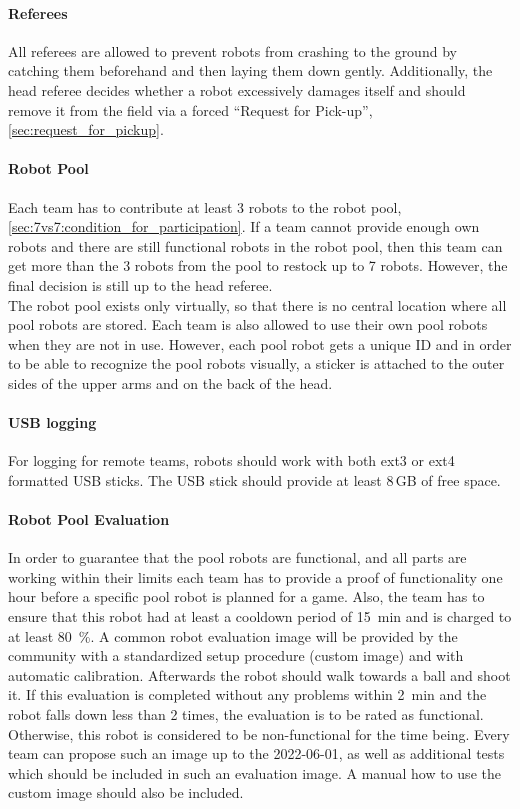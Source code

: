        \paragraph{Referees}
            \label{sec:7vs7:referee}
            All referees are allowed to prevent robots from crashing to the ground by catching them beforehand and then laying them down gently. Additionally, the head referee decides whether a robot excessively damages itself and should remove it from the field via a forced ``Request for Pick-up'', \cf \cref{sec:request_for_pickup}.

        \paragraph{Robot Pool}
            Each team has to contribute at least 3 robots to the robot pool, \cf \cref{sec:7vs7:condition_for_participation}. If a team cannot provide enough own robots and there are still functional robots in the robot pool, then this team can get more than the 3 robots from the pool to restock up to 7 robots. However, the final decision is still up to the head referee. \\
            The robot pool exists only virtually, so that there is no central location where all pool robots are stored. Each team is also allowed to use their own pool robots when they are not in use. However, each pool robot gets a unique ID and in order to be able to recognize the pool robots visually, a sticker is attached to the outer sides of the upper arms and on the back of the head.

        \paragraph{USB logging}
            For logging for remote teams, robots should work with both ext3 or ext4 formatted USB sticks. The USB stick should provide at least 8\,GB of free space.

        \paragraph{Robot Pool Evaluation}
            \label{sec:robot_pool_evaluation}
            In order to guarantee that the pool robots are functional, and all parts are working within their limits each team has to provide a proof of functionality one hour before a specific pool robot is planned for a game. Also, the team has to ensure that this robot had at least a cooldown period of \qty{15}{\minute} and is charged to at least \qty{80}{\percent}.
            A common robot evaluation image will be provided by the community with a standardized setup procedure (custom image) and with automatic calibration. Afterwards the robot should walk towards a ball and shoot it. If this evaluation is completed without any problems within \qty{2}{\minute} and the robot falls down less than 2 times, the evaluation is to be rated as functional. Otherwise, this robot is considered to be non-functional for the time being. Every team can propose such an image up to the 2022-06-01, as well as additional tests which should be included in such an evaluation image. A manual how to use the custom image should also be included.

